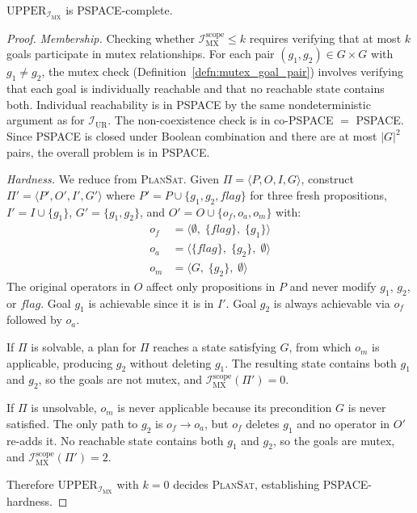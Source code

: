 \begin{thm}
    \label{thm:mx_complexity}
    $\text{UPPER}_{\mathcal{I}_{\text{MX}}}$ is PSPACE-complete.
\end{thm}
\begin{proof}
    \emph{Membership.} Checking whether $\mathcal{I}^{\text{scope}}_{\text{MX}} \leq k$ requires verifying that at most $k$ goals participate in mutex relationships. For each pair $(g_1, g_2) \in G \times G$ with $g_1 \neq g_2$, the mutex check (Definition~\ref{defn:mutex_goal_pair}) involves verifying that each goal is individually reachable and that no reachable state contains both. Individual reachability is in PSPACE by the same nondeterministic argument as for $\mathcal{I}_{\text{UR}}$. The non-coexistence check is in co-PSPACE $=$ PSPACE. Since PSPACE is closed under Boolean combination and there are at most $|G|^2$ pairs, the overall problem is in PSPACE.

    \emph{Hardness.} We reduce from \textsc{PlanSat}. Given $\Pi = \langle P, O, I, G \rangle$, construct $\Pi' = \langle P', O', I', G' \rangle$ where $P' = P \cup \{g_1, g_2, \textit{flag}\}$ for three fresh propositions, $I' = I \cup \{g_1\}$, $G' = \{g_1, g_2\}$, and $O' = O \cup \{o_f, o_a, o_m\}$ with:
    \begin{align*}
        o_f & = \langle \emptyset,\; \{\textit{flag}\},\; \{g_1\} \rangle \\
        o_a & = \langle \{\textit{flag}\},\; \{g_2\},\; \emptyset \rangle \\
        o_m & = \langle G,\; \{g_2\},\; \emptyset \rangle
    \end{align*}
    The original operators in $O$ affect only propositions in $P$ and never modify $g_1$, $g_2$, or $\textit{flag}$. Goal $g_1$ is achievable since it is in $I'$. Goal $g_2$ is always achievable via $o_f$ followed by $o_a$.

    If $\Pi$ is solvable, a plan for $\Pi$ reaches a state satisfying $G$, from which $o_m$ is applicable, producing $g_2$ without deleting $g_1$. The resulting state contains both $g_1$ and $g_2$, so the goals are not mutex, and $\mathcal{I}^{\text{scope}}_{\text{MX}}(\Pi') = 0$.

    If $\Pi$ is unsolvable, $o_m$ is never applicable because its precondition $G$ is never satisfied. The only path to $g_2$ is $o_f \to o_a$, but $o_f$ deletes $g_1$ and no operator in $O'$ re-adds it. No reachable state contains both $g_1$ and $g_2$, so the goals are mutex, and $\mathcal{I}^{\text{scope}}_{\text{MX}}(\Pi') = 2$.

    Therefore $\text{UPPER}_{\mathcal{I}_{\text{MX}}}$ with $k = 0$ decides \textsc{PlanSat}, establishing PSPACE-hardness.
\end{proof}

